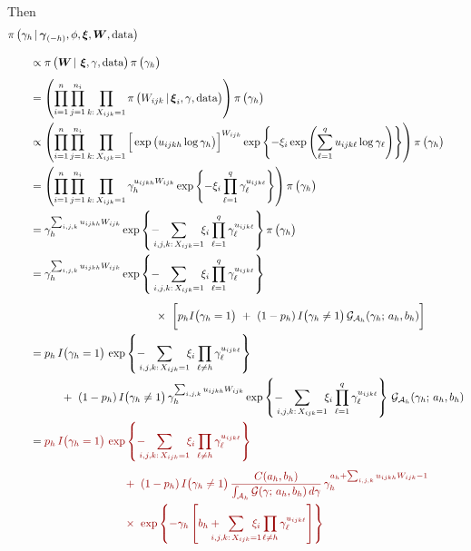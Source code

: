 \documentclass[11pt]{article}
\renewcommand{\vec}{\boldsymbol}
\newcommand{\barS}{\,|\,}
\newcommand{\ind}{I}
\newcommand{\gammaExpr}{ -\hspace{3mm} \sum_{\mathclap{i,j,k{:}\, X_{ijk}=1}} \hspace{4mm} \xi_i \prod_{\ell=1}^q \gamma_\ell^{ u_{ijk\ell} } }
\newcommand{\gammaExprNoH}{ -\hspace{3mm} \sum_{\mathclap{i,j,k{:}\, X_{ijk}=1}} \hspace{4mm} \xi_i \prod_{\ell \ne h} \gamma_\ell^{ u_{ijk\ell} } }
\begin{document}
\begin{enumerate}[label=Step \arabic*., leftmargin=13mm, itemsep=10mm]
Then
\begin{align*} \MoveEqLeft
\pi\, \big( \gamma_h \barS \vec{\gamma}_{(-h)}, \phi, \vec{\xi}, \vec{W}, \text{data} \big) \\[2ex]
& \propto \pi\, \big( \vec{W} \barS\, \vec{\xi}, \gamma, \text{data} \big)\, \pi\,\big( \gamma_h \big) \\[1ex]
&= \left( \prod_{i=1}^{n} \prod_{j=1}^{n_i} \prod_{k{:}\, X_{ijk} = 1} \pi\, \big( W_{ijk} \barS \vec{\xi}_i, \gamma, \text{data} \big) \right) \pi\, \big( \gamma_h \big) \\
&\propto \left( \prod_{i=1}^{n} \prod_{j=1}^{n_i} \prod_{k{:}\, X_{ijk} = 1} \Big[ \exp\big( u_{ijkh} \log \gamma_h \big) \Big]^{W_{ijk}} \exp\left\{ -\xi_i \exp\left( \sum_{\ell=1}^q u_{ijk\ell} \log \gamma_{\ell} \right) \right\} \right) \pi\, \big( \gamma_h \big) \\
&= \left( \prod_{i=1}^{n} \prod_{j=1}^{n_i} \prod_{k{:}\, X_{ijk} = 1} \gamma_h^{ u_{ijkh} W_{ijk} } \exp\left\{ -\xi_i \prod_{\ell=1}^q \gamma_\ell^{ u_{ijk\ell} } \right\} \right) \pi\, \big( \gamma_h \big) \\
&= \gamma_h^{ \sum_{i,j,k} u_{ijkh} W_{ijk} } \exp\left\{ \gammaExpr \right\} \pi\, \big( \gamma_h \big) \\
&= \gamma_h^{ \sum_{i,j,k} u_{ijkh} W_{ijk} } \exp\left\{ \gammaExpr \right\} \\[1ex]
& \hspace{40mm} \times~ \bigg[ p_h \ind\big( \gamma_h = 1 \big) ~+~ (1 - p_h)\, \ind\big( \gamma_h \ne 1 \big)\, \mathcal{G}_{\mathcal{A}_h} (\gamma_h;\, a_h,b_h) \bigg] \\
&= p_h\, \ind\big( \gamma_h = 1 \big)\, \exp\left\{ \gammaExprNoH \right\} \\
& \hspace{10mm} +~ (1 - p_h)\, \ind\big(\gamma_h \ne 1 \big)\, \gamma_h^{ \sum_{i,j,k} u_{ijkh} W_{ijk} } \exp\left\{ \gammaExpr \right\} \, \mathcal{G}_{\mathcal{A}_h} (\gamma_h;\, a_h,b_h) \\
&= \color{QuestCol} p_h\, \ind\big( \gamma_h = 1 \big)\, \exp\left\{ \gammaExprNoH \right\} \\[1ex]
& \color{QuestCol} \hspace{30mm} +~ (1 - p_h)\, \ind\big(\gamma_h \ne 1 \big)\, \frac{ C(a_h,b_h) }{ \int_{\mathcal{A}_h} \mathcal{G}(\gamma;\, a_h,b_h)\, d\gamma }\, \gamma_h^{ a_h + \sum_{i,j,k} u_{ijkh} W_{ijk} - 1 } \\
& \color{QuestCol} \hspace{30mm} \times~ \exp\left\{ -\gamma_h \left[ b_h +\hspace{2mm} \sum_{\mathclap{i,j,k{:}\, X_{ijk}=1}} \hspace{2mm} \xi_i \prod_{\ell \ne h} \gamma_\ell^{ u_{ijk\ell} } \right] \right\} \\[2ex]

\end{align*}
\end{enumerate}
\end{document}
